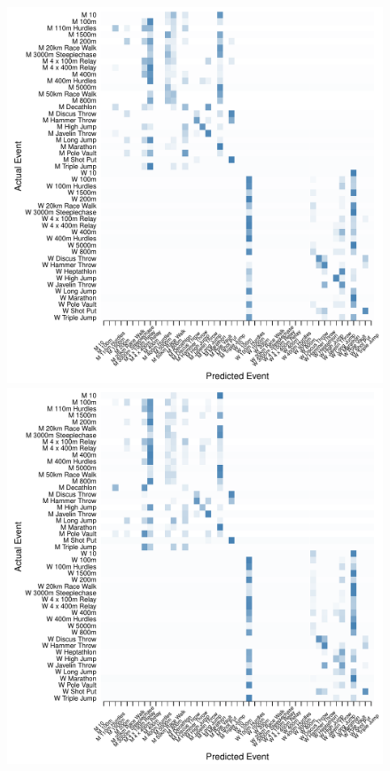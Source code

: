 \begin{figure}
\begin{center}
\begin{minipage}{0.20\textwidth}
\begin{center}
    \end{center}
  \end{minipage}
  \hspace{0.05\textwidth}
    \begin{minipage}{0.20\textwidth}
    \begin{center}
      \includegraphics[scale=0.20]{../graphics/athletesCIT-trn.pdf}
    \end{center}
  \end{minipage}
  \hspace{0.05\textwidth}
  \begin{minipage}{0.20\textwidth}
    \begin{center}
      \includegraphics[scale=0.20]{../graphics/athletesCIT-tst.pdf}

\end{center}
\end{minipage}
\end{center}
\end{figure}

